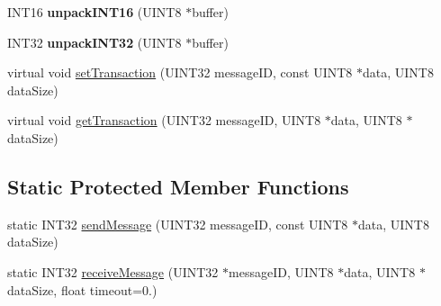 \begin{DoxyCompactItemize}
\item 
\hypertarget{classCANJaguar_a303bb788587002180deca44df0bb079b}{\-I\-N\-T16 {\bfseries unpack\-I\-N\-T16} (\-U\-I\-N\-T8 $\ast$buffer)}\label{classCANJaguar_a303bb788587002180deca44df0bb079b}

\item 
\hypertarget{classCANJaguar_a14598f98ca14a4914f54d5d896dc0f8b}{\-I\-N\-T32 {\bfseries unpack\-I\-N\-T32} (\-U\-I\-N\-T8 $\ast$buffer)}\label{classCANJaguar_a14598f98ca14a4914f54d5d896dc0f8b}

\item 
virtual void \hyperlink{classCANJaguar_adbe1668f13ba9cc7275c694c5aae01e0}{set\-Transaction} (\-U\-I\-N\-T32 message\-I\-D, const \-U\-I\-N\-T8 $\ast$data, \-U\-I\-N\-T8 data\-Size)
\item 
virtual void \hyperlink{classCANJaguar_a43eb6ab169c31a833dc38fd95eeca06e}{get\-Transaction} (\-U\-I\-N\-T32 message\-I\-D, \-U\-I\-N\-T8 $\ast$data, \-U\-I\-N\-T8 $\ast$data\-Size)
\end{DoxyCompactItemize}
\subsection*{\-Static \-Protected \-Member \-Functions}
\begin{DoxyCompactItemize}
\item 
static \-I\-N\-T32 \hyperlink{classCANJaguar_a987e2191d5fc2500c8716aae68b0c567}{send\-Message} (\-U\-I\-N\-T32 message\-I\-D, const \-U\-I\-N\-T8 $\ast$data, \-U\-I\-N\-T8 data\-Size)
\item 
static \-I\-N\-T32 \hyperlink{classCANJaguar_adaa8089e65ba5784df5eda9cf753eb8f}{receive\-Message} (\-U\-I\-N\-T32 $\ast$message\-I\-D, \-U\-I\-N\-T8 $\ast$data, \-U\-I\-N\-T8 $\ast$data\-Size, float timeout=0.)
\end{DoxyCompactItemize}
